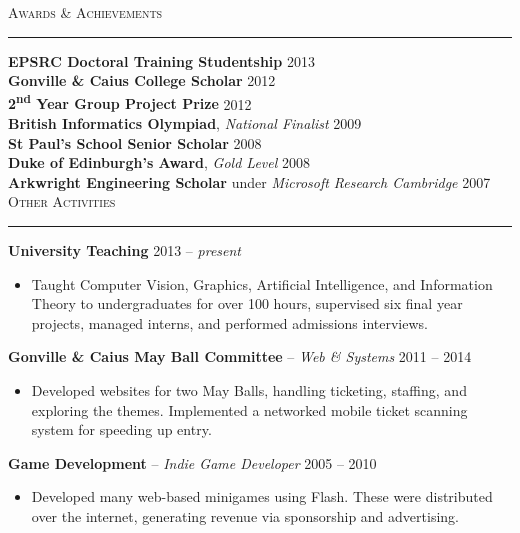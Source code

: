 \documentclass{article}
\begin{document}
\textsc{Awards \& Achievements} \smallskip \hrule \smallskip

\textbf{EPSRC Doctoral Training Studentship} \hfill 2013 \\[+1mm]
\textbf{Gonville \& Caius College Scholar} \hfill 2012 \\[+1mm]
\textbf{2\textsuperscript{nd} Year Group Project Prize} \hfill 2012 \\[+1mm]
\textbf{British Informatics Olympiad}, \emph{National Finalist} \hfill 2009 \\[+1mm]
\textbf{St Paul's School Senior Scholar} \hfill 2008 \\[+1mm]
\textbf{Duke of Edinburgh's Award}, \emph{Gold Level} \hfill 2008 \\[+1mm]
\textbf{Arkwright Engineering Scholar} under \emph{Microsoft Research Cambridge} \hfill 2007 \\

\textsc{Other Activities} \smallskip \hrule \smallskip

\textbf{University Teaching} \hfill 2013 -- \emph{present} \\[-6mm]
\begin{itemize}
  \item[]
  Taught Computer Vision, Graphics, Artificial Intelligence, and Information Theory to undergraduates for over 100 hours, supervised six final year projects, managed interns, and performed admissions interviews.
\end{itemize} \smallskip

\textbf{Gonville \& Caius May Ball Committee} -- \emph{Web \& Systems} \hfill 2011 -- 2014
\\[-6mm]
\begin{itemize}
  \item[]
  Developed websites for two May Balls, handling ticketing, staffing, and exploring the themes. Implemented a networked mobile ticket scanning system for speeding up entry.
\end{itemize} \smallskip

\textbf{Game Development} -- \emph{Indie Game Developer} \hfill 2005 -- 2010 \\[-6mm]
\begin{itemize}
  \item[]
  Developed many web-based minigames using Flash. These were distributed over the
  internet, generating revenue via sponsorship and advertising.
\end{itemize} \bigskip
\end{document}
